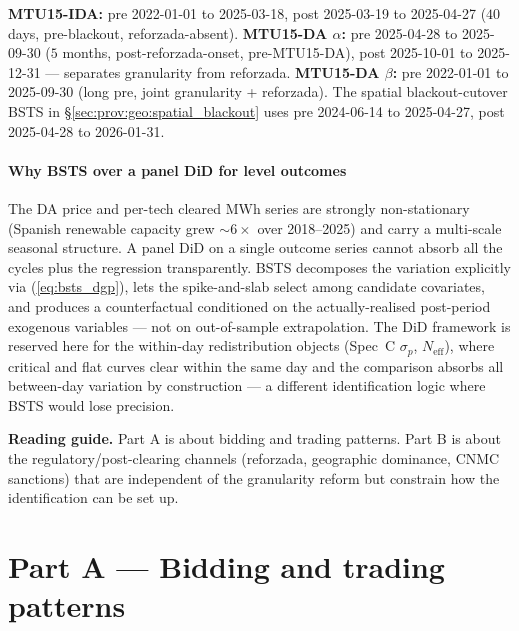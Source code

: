 \documentclass[11pt,a4paper]{article}
\begin{document}
\noindent\textbf{MTU15-IDA:} pre 2022-01-01 to 2025-03-18, post 2025-03-19 to 2025-04-27 ($40$ days, pre-blackout, reforzada-absent). \textbf{MTU15-DA $\alpha$:} pre 2025-04-28 to 2025-09-30 ($5$ months, post-reforzada-onset, pre-MTU15-DA), post 2025-10-01 to 2025-12-31 --- separates granularity from reforzada. \textbf{MTU15-DA $\beta$:} pre 2022-01-01 to 2025-09-30 (long pre, joint granularity + reforzada). The spatial blackout-cutover BSTS in \S\ref{sec:prov:geo:spatial_blackout} uses pre 2024-06-14 to 2025-04-27, post 2025-04-28 to 2026-01-31.

\subsection*{Why BSTS over a panel DiD for level outcomes}

\noindent The DA price and per-tech cleared MWh series are strongly non-stationary (Spanish renewable capacity grew $\sim 6\times$ over 2018--2025) and carry a multi-scale seasonal structure. A panel DiD on a single outcome series cannot absorb all the cycles plus the regression transparently. BSTS decomposes the variation explicitly via (\ref{eq:bsts_dgp}), lets the spike-and-slab select among candidate covariates, and produces a counterfactual conditioned on the actually-realised post-period exogenous variables --- not on out-of-sample extrapolation. The DiD framework is reserved here for the within-day redistribution objects (Spec~C $\sigma_p$, $N_{\text{eff}}$), where critical and flat curves clear within the same day and the comparison absorbs all between-day variation by construction --- a different identification logic where BSTS would lose precision.

\bigskip

\noindent\textbf{Reading guide.} Part A is about bidding and trading patterns. Part B is about the regulatory/post-clearing channels (reforzada, geographic dominance, CNMC sanctions) that are independent of the granularity reform but constrain how the identification can be set up.

\part{Part A --- Bidding and trading patterns}
\end{document}
